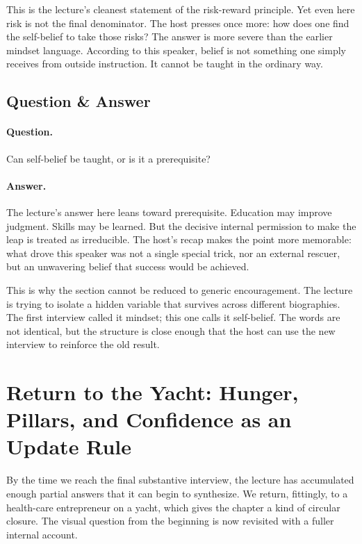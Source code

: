 This is the lecture's cleanest statement of the risk-reward principle. Yet even here risk is not the final denominator. The host presses once more: how does one find the self-belief to take those risks? The answer is more severe than the earlier mindset language. According to this speaker, belief is not something one simply receives from outside instruction. It cannot be taught in the ordinary way.

\subsection{Question \& Answer}

\paragraph{Question.}
Can self-belief be taught, or is it a prerequisite?

\paragraph{Answer.}
The lecture's answer here leans toward prerequisite. Education may improve judgment. Skills may be learned. But the decisive internal permission to make the leap is treated as irreducible. The host's recap makes the point more memorable: what drove this speaker was not a single special trick, nor an external rescuer, but an unwavering belief that success would be achieved.

This is why the section cannot be reduced to generic encouragement. The lecture is trying to isolate a hidden variable that survives across different biographies. The first interview called it mindset; this one calls it self-belief. The words are not identical, but the structure is close enough that the host can use the new interview to reinforce the old result.

\section{Return to the Yacht: Hunger, Pillars, and Confidence as an Update Rule}

By the time we reach the final substantive interview, the lecture has accumulated enough partial answers that it can begin to synthesize. We return, fittingly, to a health-care entrepreneur on a yacht, which gives the chapter a kind of circular closure. The visual question from the beginning is now revisited with a fuller internal account.

